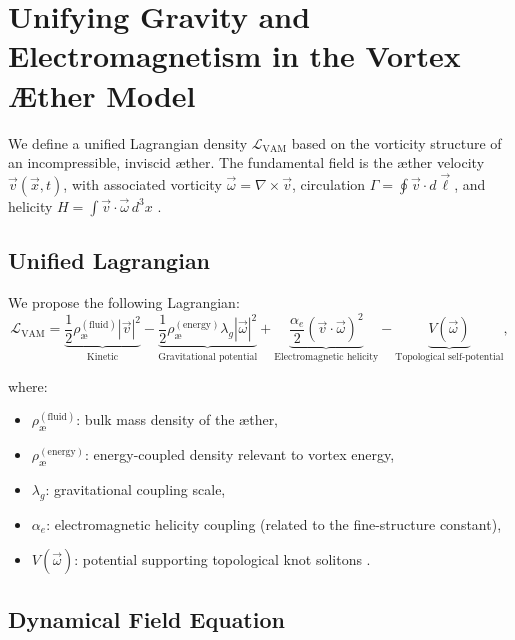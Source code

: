 \section{Unifying Gravity and Electromagnetism in the Vortex \AE ther Model}

We define a unified Lagrangian density \( \mathcal{L}_\text{VAM} \) based on the vorticity structure of an incompressible, inviscid æther. The fundamental field is the æther velocity \( \vec{v}(\vec{x}, t) \), with associated vorticity \( \vec{\omega} = \nabla \times \vec{v} \), circulation \( \Gamma = \oint \vec{v} \cdot d\vec{\ell} \), and helicity \( H = \int \vec{v} \cdot \vec{\omega} \, d^3x \) \cite{moffatt1969degree,arnold1998topological}.

\subsection*{Unified Lagrangian}

We propose the following Lagrangian:
\begin{equation}
\label{eq:L_VAM}
\mathcal{L}_\text{VAM} =
\underbrace{\frac{1}{2} \rho_\text{\ae}^{(\text{fluid})} |\vec{v}|^2}_{\text{Kinetic}} -
\underbrace{\frac{1}{2} \rho_\text{\ae}^{(\text{energy})} \lambda_g |\vec{\omega}|^2}_{\text{Gravitational potential}} +
\underbrace{\frac{\alpha_e}{2} (\vec{v} \cdot \vec{\omega})^2}_{\text{Electromagnetic helicity}} -
\underbrace{V(\vec{\omega})}_{\text{Topological self-potential}},
\end{equation}

where:
\begin{itemize}
    \item \( \rho_\text{\ae}^{(\text{fluid})} \): bulk mass density of the æther,
    \item \( \rho_\text{\ae}^{(\text{energy})} \): energy-coupled density relevant to vortex energy,
    \item \( \lambda_g \): gravitational coupling scale,
    \item \( \alpha_e \): electromagnetic helicity coupling (related to the fine-structure constant),
    \item \( V(\vec{\omega}) \): potential supporting topological knot solitons \cite{faddeev1997stable,babaev2002knotted}.
\end{itemize}

\subsection*{Dynamical Field Equation}

